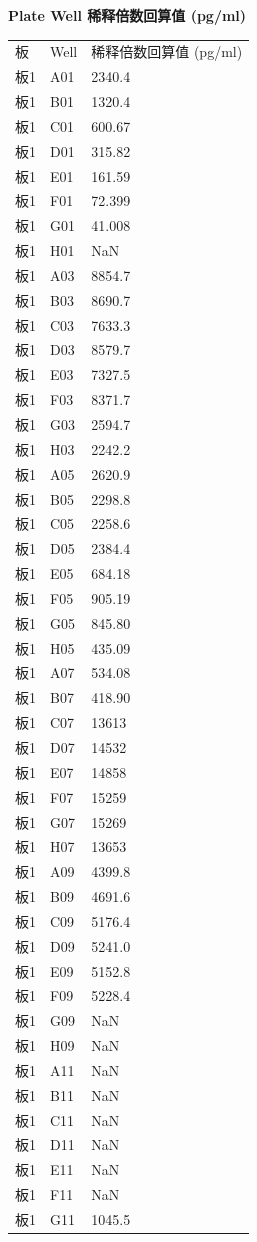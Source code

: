 \documentclass[UTF8,10pt,a4paper,fontset=fandol]{ctexart}
\begin{document}
\vspace{0.8em}

\noindent\textbf{Plate Well 稀释倍数回算值 (pg/ml)}

\begin{tabular}{@{}lll@{}}
\small
板 & Well & 稀释倍数回算值 (pg/ml) \\
板1 & A01 & 2340.4 \\
板1 & B01 & 1320.4 \\
板1 & C01 & 600.67 \\
板1 & D01 & 315.82 \\
板1 & E01 & 161.59 \\
板1 & F01 & 72.399 \\
板1 & G01 & 41.008 \\
板1 & H01 & NaN \\
板1 & A03 & 8854.7 \\
板1 & B03 & 8690.7 \\
板1 & C03 & 7633.3 \\
板1 & D03 & 8579.7 \\
板1 & E03 & 7327.5 \\
板1 & F03 & 8371.7 \\
板1 & G03 & 2594.7 \\
板1 & H03 & 2242.2 \\
板1 & A05 & 2620.9 \\
板1 & B05 & 2298.8 \\
板1 & C05 & 2258.6 \\
板1 & D05 & 2384.4 \\
板1 & E05 & 684.18 \\
板1 & F05 & 905.19 \\
板1 & G05 & 845.80 \\
板1 & H05 & 435.09 \\
板1 & A07 & 534.08 \\
板1 & B07 & 418.90 \\
板1 & C07 & 13613 \\
板1 & D07 & 14532 \\
板1 & E07 & 14858 \\
板1 & F07 & 15259 \\
板1 & G07 & 15269 \\
板1 & H07 & 13653 \\
板1 & A09 & 4399.8 \\
板1 & B09 & 4691.6 \\
板1 & C09 & 5176.4 \\
板1 & D09 & 5241.0 \\
板1 & E09 & 5152.8 \\
板1 & F09 & 5228.4 \\
板1 & G09 & NaN \\
板1 & H09 & NaN \\
板1 & A11 & NaN \\
板1 & B11 & NaN \\
板1 & C11 & NaN \\
板1 & D11 & NaN \\
板1 & E11 & NaN \\
板1 & F11 & NaN \\
板1 & G11 & 1045.5 \\
\end{tabular}
\end{document}
